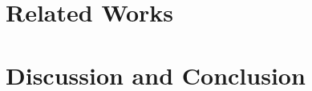 \documentclass{article}
\begin{document}






\section{Related Works}\label{sec:related_works}


\section{Discussion and Conclusion}\label{sec:discussion}


\newpage



\appendix
\startcontents[apx]          %

\clearpage

\end{document}
